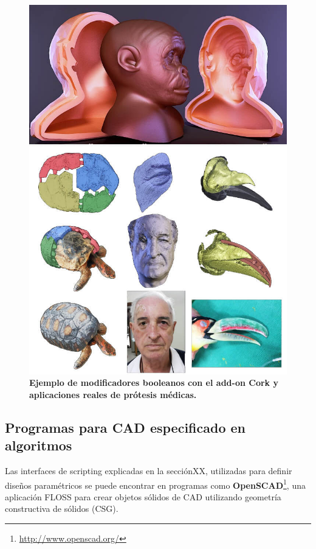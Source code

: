 \begin{figure}[h]
\includegraphics[width=12cm]{Img/Modelos/corkc.jpg}
\centering
\caption{\textbf{ \footnotesize{Ejemplo de modificadores booleanos con el add-on Cork y aplicaciones reales de prótesis médicas.   }}}
\label{fig:cork}
\end{figure}





\clearpage

\subsection{Programas para CAD especificado en algoritmos}
Las interfaces de scripting explicadas en la secciónXX, utilizadas para definir diseños paramétricos se puede encontrar en programas como \textbf{OpenSCAD}\footnote{\url{http://www.openscad.org/}}, una aplicación FLOSS para crear objetos sólidos de CAD utilizando geometría constructiva de sólidos (CSG).

